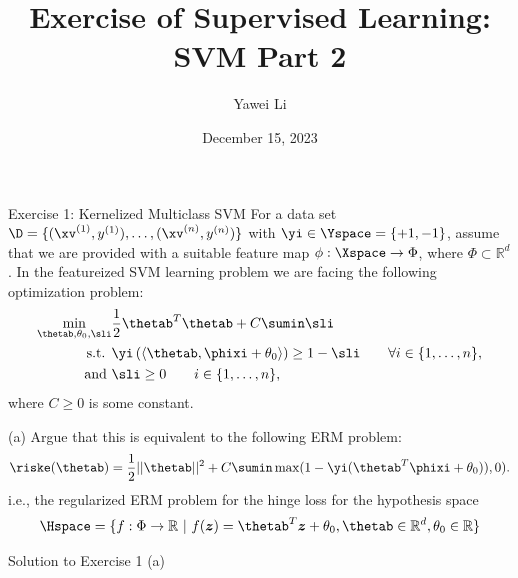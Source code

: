 \documentclass[aspectratio=169]{beamer}
\title[]{\textbf{Exercise of Supervised Learning: \\ SVM Part 2}}
\author{Yawei Li}
\institute[LMU]
{
\\
  \texttt{yawei.li@stat.uni-muenchen.de}
}
\date{December 15, 2023}
\newcommand{\zv}{\bm{z}}
\begin{document}
\begin{frame}
\titlepage

\end{frame}

\begin{frame}{Exercise 1: Kernelized Multiclass SVM}
	\small
	For a data set $\D = \{(\xv^{(1)}, y^{(1)}), \ldots, (\xv^{(n)}, y^{(n)}) \}$ with $\yi \in \Yspace = \{+1, -1 \}$, assume that we are provided with a suitable feature map $\phi: \Xspace \to \Phi$, where $\Phi \subset \mathbb{R}^d$. In the featureized SVM learning problem we are facing the following optimization problem:
	\begin{align*}
		\min_{\thetab, \theta_0, \sli} &\frac{1}{2} \thetab^T \thetab + C \sumin \sli \\
		\text{s.t. } & \yi \left(\left\langle \thetab, \phixi + \theta_0 \right\rangle \right) \geq 1 - \sli \qquad \forall i \in \{1, \ldots, n \}, \\
		\text{and } & \sli \geq 0 \qquad i \in \{1, \ldots, n \},
	\end{align*}
	where $C \geq 0$ is some constant.
	
	(a) Argue that this is equivalent to the following ERM problem:
		\begin{align*}
			\riske(\thetab) = \frac{1}{2} ||\thetab||^2 + C\sumin \max(1 - \yi(\thetab^T \phixi + \theta_0)), 0).
		\end{align*}
		i.e., the regularized ERM problem for the hinge loss for the hypothesis space 
		\begin{align*}
			\Hspace = \{f: \Phi \to \mathbb{R} \ | \ f(\zv) = \thetab^T \zv + \theta_0, \thetab \in \mathbb{R}^d, \theta_0 \in \mathbb{R} \}
		\end{align*}
\end{frame}

\begin{frame}{Solution to Exercise 1 (a)}
	
\end{frame}
\end{document}
